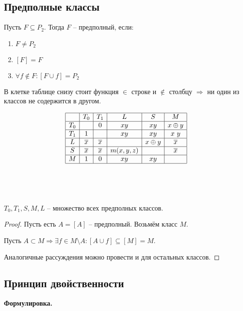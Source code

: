 \subsection{Предполные классы}

\begin{definition}
	Пусть $F \subseteq P_2$. Тогда $F$ -- предполный, если: 
	\begin{enumerate}
		\item $F \ne P_2$
		\item $[F] = F$
		\item $\forall f \notin F: [F \cup {f}] = P_2$
	\end{enumerate}
\end{definition}

В клетке таблице снизу стоит функция $\in$ строке и $\not \in $ столбцу $\Rightarrow$ ни один из классов не содержится в другом.

$$\begin{array}{|c|c|c|c|c|c|}
\hline
 & T_0 & T_1 & L & S & M  \\
\hline
T_0 &  & 0 & xy & xy & x \oplus y \\
\hline
T_1 & 1 & &  xy & xy &  x ~ y \\
\hline
L & \overline{x} & \overline{x} &  & x \oplus y & \overline{x}\\
\hline
S & \overline{x} & \overline{x} & m(x, y, z) &  & \overline{x} \\
\hline
M & 1 & 0 & xy & xy &  \\
\hline
\end{array}$$
\\
\\\\

\begin{theorem}
	$T_0, T_1, S, M, L$ -- множество всех предполных классов.
\end{theorem}

\begin{proof}
	Пусть есть $A = [A]$ -- предполный. Возьмём класс $M$.

	Пусть $A \subset M \Rightarrow \exists f \in M \setminus A : [A \cup {f}] \subseteq [M] = M$.

	Аналогичные рассуждения можно провести и для остальных классов.
\end{proof}

\subsection{Принцип двойственности}
{\bf Формулировка.}

